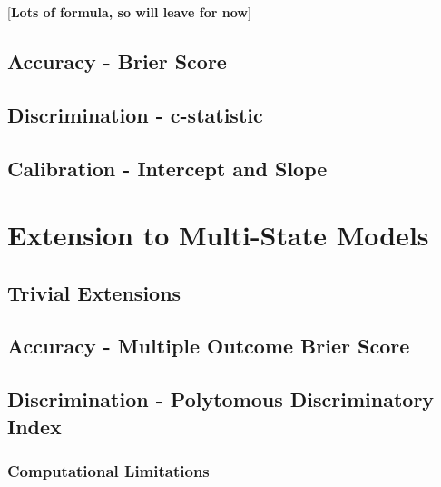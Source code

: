 \documentclass[12pt,PhD,twoside,openright]{muthesis}
\begin{document}
{[}\textbf{Lots of formula, so will leave for now}{]}

\hypertarget{accuracy---brier-score}{%
\subsection{Accuracy - Brier Score}\label{accuracy---brier-score}}

\hypertarget{discrimination---c-statistic}{%
\subsection{Discrimination - c-statistic}\label{discrimination---c-statistic}}

\hypertarget{calibration---intercept-and-slope}{%
\subsection{Calibration - Intercept and Slope}\label{calibration---intercept-and-slope}}

\hypertarget{extension-to-multi-state-models}{%
\section{Extension to Multi-State Models}\label{extension-to-multi-state-models}}

\hypertarget{trivial-extensions}{%
\subsection{Trivial Extensions}\label{trivial-extensions}}

\hypertarget{accuracy---multiple-outcome-brier-score}{%
\subsection{Accuracy - Multiple Outcome Brier Score}\label{accuracy---multiple-outcome-brier-score}}

\hypertarget{discrimination---polytomous-discriminatory-index}{%
\subsection{Discrimination - Polytomous Discriminatory Index}\label{discrimination---polytomous-discriminatory-index}}

\hypertarget{computational-limitations}{%
\subsubsection{Computational Limitations}\label{computational-limitations}}
\end{document}
